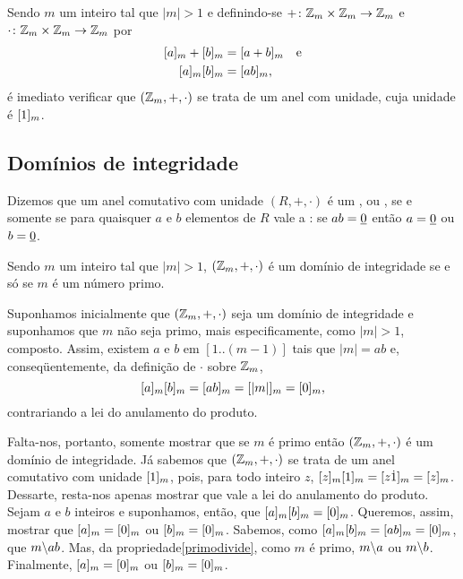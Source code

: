 \begin{Obs}
  Sendo $m$ um inteiro tal que
  $|m|>1$ e definindo-se $\funcao{+}{\MMZ_m\times\MMZ_m}%
  {\MMZ_m}$ e $\cdot\colon \mathbb{Z}_m\times\mathbb{Z}_m\rightarrow \mathbb{Z}_m$ por
  \begin{equation*}
    \begin{aligned}
      \cleq{a}{m}+\cleq{b}{m} &= \cleq{a+b}{m}\quad\text{e}\\
      \cleq{a}{m}\cleq{b}{m}  &= \cleq{ab}{m}\MMv
    \end{aligned}
  \end{equation*}
  é imediato verificar que $(\mathbb{Z}_m,+,\cdot)$ se trata de um anel com
  unidade, cuja unidade é $[1]_{m}$.
\end{Obs}

\subsection{Domínios de integridade}

\begin{Def}
  Dizemos que um anel comutativo com unidade $(R,+,\cdot)$ é um
  , ou ,
  se e somente se para quaisquer $a$ e $b$ elementos de $R$ vale
  a :
  se
  $ab=\underline{0}$ então $a=\underline{0}$ ou $b=\underline{0}$.
\end{Def}

\begin{Teo}\label{teodiprimo}
  Sendo $m$ um inteiro tal que $|m|>1$,
  $(\mathbb{Z}_m,+,\cdot)$ é um domínio de integridade
  se e só se $m$ é um número primo.
\end{Teo}

\begin{dem}
  Suponhamos inicialmente que $(\mathbb{Z}_m,+,\cdot)$
  seja um domínio de integridade e suponhamos que $m$ não seja
  primo, mais especificamente, como $|m|>1$, composto. Assim, existem
  $a$ e $b$ em $[1..(m-1)]$ tais que $|m|=ab$ e, conseqüentemente,
  da definição de $\cdot$ sobre $\mathbb{Z}_m$,
  \begin{equation*}
    [a]_{m}[b]_{m} = [ab]_{m}
    = [|m|]_{m} = [0]_{m}\mathrm{,}
  \end{equation*}
  contrariando a lei do anulamento do produto.

  Falta-nos, portanto, somente mostrar que se $m$ é primo então
  $(\mathbb{Z}_m,+,\cdot)$ é um domínio de integridade. Já sabemos que
  $(\mathbb{Z}_m,+,\cdot)$ se trata de um anel comutativo com unidade
  $[1]_{m}$, pois, para todo inteiro $z$, $[z]_{m}[1]_{m} =
  [z\dot 1]_{m} = [z]_{m}$.
  Dessarte, resta-nos apenas
  mostrar que vale a lei do anulamento do produto. Sejam $a$ e $b$
  inteiros e suponhamos,
  então, que $[a]_{m}[b]_{m}=[0]_{m}$.
  Queremos, assim, mostrar que $[a]_{m}=[0]_{m}$ ou
  $[b]_{m}=[0]_{m}$.
  Sabemos, como $[a]_{m}[b]_{m}=[ab]_{m}=[0]_{m}$,
  que $m\backslash ab$. Mas,
  da propriedade\xspace\ref{primodivide}, como
  $m$ é primo, $m\backslash a$ ou $m\backslash b$. Finalmente,
  $[a]_{m}=[0]_{m}$
  ou
  $[b]_{m}=[0]_{m}$.
\end{dem}

